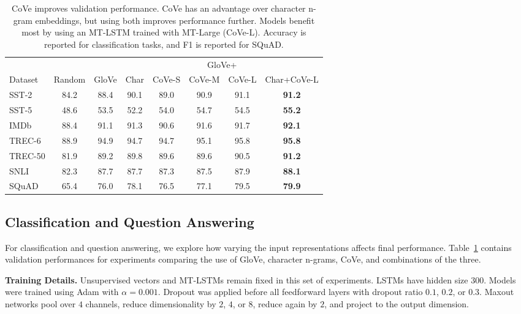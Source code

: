 \begin{table}
\captionsetup{width=.92\textwidth}
  \centering
\begin{tabular}{lccccccc}
\toprule
        &        &       & \multicolumn{5}{c}{GloVe+} \\
\cmidrule(lr){4-8}
Dataset & Random & GloVe & Char & CoVe-S & CoVe-M & CoVe-L & Char+CoVe-L \\
\midrule
SST-2   & 84.2 & 88.4 & 90.1 & 89.0 & 90.9 & 91.1 & \textbf{91.2}\\ 
SST-5   & 48.6 & 53.5 & 52.2 & 54.0 & 54.7 & 54.5 & \textbf{55.2}\\
IMDb    & 88.4 & 91.1 & 91.3 & 90.6 & 91.6 & 91.7 & \textbf{92.1}\\
TREC-6  & 88.9 & 94.9 & 94.7 & 94.7 & 95.1 & 95.8 & \textbf{95.8}\\ 
TREC-50 & 81.9 & 89.2 & 89.8 & 89.6 & 89.6 & 90.5 & \textbf{91.2}\\
SNLI    & 82.3 & 87.7 & 87.7 & 87.3 & 87.5 & 87.9 & \textbf{88.1}\\
SQuAD   & 65.4 & 76.0 & 78.1 & 76.5 & 77.1 & 79.5 & \textbf{79.9}\\
\bottomrule
  \end{tabular}
      \caption{CoVe improves validation performance. CoVe has an advantage over character n-gram embeddings, but using both improves performance further. Models benefit most by using an MT-LSTM trained with MT-Large (CoVe-L). Accuracy is reported for classification tasks, and F1 is reported for SQuAD.}
  \label{validationPerformance}
  \vspace{-0.8cm}
\end{table}
 
\subsection{Classification and Question Answering}
For classification and question answering, 
we explore how varying the input representations affects final performance.
Table~\ref{validationPerformance} contains validation performances for experiments comparing the use of GloVe, character n-grams, CoVe, and combinations of the three.

\textbf{Training Details.}
Unsupervised vectors and MT-LSTMs remain fixed in this set of experiments.
LSTMs have hidden size 300.
Models were trained using Adam with $\alpha=0.001$. 
Dropout was applied before all feedforward layers with dropout ratio $0.1$, $0.2$, or $0.3$.
Maxout networks pool over $4$ channels, reduce dimensionality by $2$, $4$, or $8$, reduce again by $2$, and project to the output dimension.

